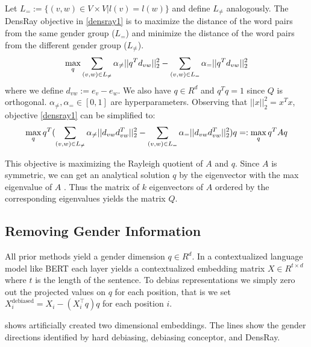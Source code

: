 Let $L_{=}:=\{(v,w)\in V\times V|l(v)=l(w)\}$ and define
$L_{\neq}$ analogously.  The DensRay objective
in \eqref{densray1} is to maximize the distance of the word
pairs from the same gender group ($L_{=}$) and minimize the
distance of the word pairs from the different gender group
($L_{\neq}$).
\begin{eqnarray}
\max\limits_{q} 
\sum_{(v,w)\in L_{\neq}}\alpha_{\neq}||q^Td_{vw}||^2_2
-\sum_{(v,w)\in L_{=}}\alpha_{=}||q^Td_{vw}||^2_2
\eqlabel{densray1}
\end{eqnarray}
where we define $d_{vw}:=e_v-e_w$. We also have $q\in R^d$
and $q^Tq=1$ since $Q$ is orthogonal. $\alpha_{\neq},\alpha_{=}\in [0,1]$ are hyperparameters. Observing that $||x||^2_2=x^Tx$, objective \eqref{densray1} can be simplified to:
\begin{eqnarray}
\max \limits_{q} q^T(
\sum_{(v,w)\in L_{\neq}}\alpha_{\neq}||d_{vw}d_{vw}^T||^2_2-\sum_{(v,w)\in L_{=}}\alpha_{=}||d_{vw}d_{vw}^T||^2_2)q=:\max\limits_{q} q^TAq
\eqlabel{eq:densray2}
\end{eqnarray}

This objective is maximizing the Rayleigh quotient of $A$ and $q$. Since $A$ is symmetric, we can get an analytical solution $q$ by the eigenvector with the max eigenvalue of $A$ \cite{horn1990matrix}. 
Thus the matrix of $k$ eigenvectors of $A$ ordered by the corresponding eigenvalues yields the matrix $Q$.
\subsection{Removing Gender Information}

All prior methods yield a gender dimension $q \in R^d$. In a contextualized language model like BERT each layer yields a contextualized embedding matrix $X \in R^{t \times d}$ where $t$ is the length of the sentence. To debias representations we simply zero out the projected values on $q$ for each position, that is we set $X^{\text{debiased}}_i = X_i -  (X_i^\intercal q) q$ for each position $i$.

  shows artificially created two dimensional embeddings. The lines show the gender directions identified by hard debiasing, debiasing conceptor, and DensRay. 
 
